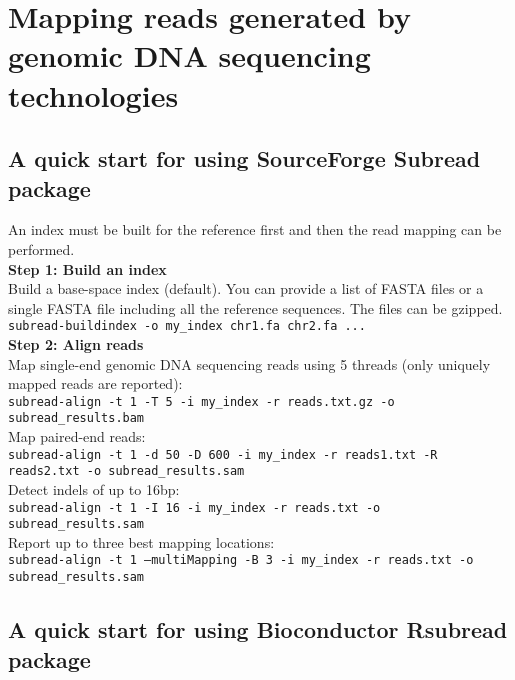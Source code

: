 \documentclass[12pt]{report}
\newcommand{\code}[1]{{\small\texttt{#1}}}
\newcommand{\Subread}{\textsf{Subread}}
\newcommand{\Rsubread}{\textsf{Rsubread}}
\begin{document}
\chapter{Mapping reads generated by genomic DNA sequencing technologies}
\label{chapter:subread-dnaseq}

\section{A quick start for using SourceForge {\Subread} package}

An index must be built for the reference first and then the read mapping can be performed.\\

{\noindent\bf Step 1: Build an index}\\

\noindent Build a base-space index (default). You can provide a list of FASTA files or a single FASTA file including all the reference sequences. The files can be gzipped.\\

\code{subread-buildindex -o my\_index chr1.fa chr2.fa ...}\\

{\noindent\bf Step 2: Align reads}\\

\noindent Map single-end genomic DNA sequencing reads using 5 threads (only uniquely mapped reads are reported):\\
\code{subread-align -t 1 -T 5 -i my\_index -r reads.txt.gz -o subread\_results.bam}\\

\noindent Map paired-end reads:\\
\code{subread-align -t 1 -d 50 -D 600 -i my\_index -r reads1.txt -R reads2.txt \newline -o subread\_results.sam}\\

\noindent Detect indels of up to 16bp:\\
\code{subread-align -t 1 -I 16 -i my\_index -r reads.txt -o subread\_results.sam}\\

\noindent Report up to three best mapping locations:\\
\code{subread-align -t 1 --multiMapping -B 3 -i my\_index -r reads.txt -o subread\_results.sam}\\


\section{A quick start for using Bioconductor {\Rsubread} package}
\end{document}
